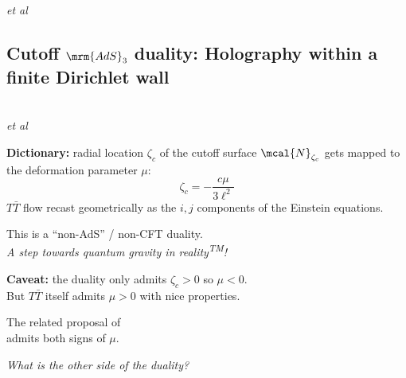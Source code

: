 \documentclass[10pt]{article}
\newcommand{\citations}[1]{{\footnotesize#1\par}}
\newcommand{\reality}{reality\textsuperscript{TM}}
\newcommand{\TTbar}{\texorpdfstring{\ensuremath{T\bar{T}}}{TTbar}\xspace}
\begin{document}
\begin{multicols}{3}
\begin{itemize}
\citations{
\textcite{Zamolodchikov:2004ce}\\
\textcite{Dubovsky:2012wk}\\
\textcite{Dubovsky:2013ira}\\
\textcite{Smirnov:2016lqw}\\
\textcite{Cavaglia:2016oda} \textit{et al}%
}

\vspace{-.5\baselineskip}

\end{itemize}

\subsection*{Cutoff $\mrm{AdS}_3$ duality:\texstringonly{\\} Holography within a finite Dirichlet wall}

\citations{
\textcite{McGough:2016lol}\\
\textcite{Kraus:2018xrn} \textit{et al}
}

\textbf{Dictionary:} radial location $\zeta_c$ of the cutoff surface $\mcal{N}_{\zeta_c}$ gets mapped to the deformation parameter $\mu$:
\begin{equation}
	\zeta_c = - \frac{c \mu}{3\ell^2}
	\label{dictionary}
\end{equation}
\TTbar flow recast geometrically as the $i,j$ components of the Einstein equations. 

This is a ``non-AdS'' / non-CFT duality.\\
\textit{A step towards quantum gravity in \reality!}

\textbf{Caveat:} the duality only admits $\zeta_c > 0$ so $\mu < 0$.\\
But \TTbar itself admits $\mu > 0$ with nice properties.

\citations{The related proposal of \textcite{Guica:2019nzm}\\
admits both signs of $\mu$.}

\textit{What is the other side of the duality?}

\columnbreak


\end{multicols}
\end{document}
